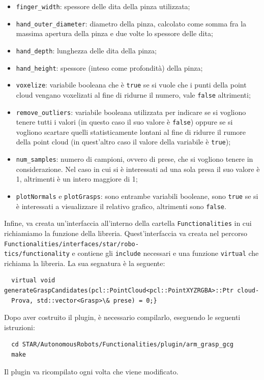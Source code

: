 \documentclass{report}
\begin{document}
\begin{itemize}
\item \texttt{finger\_width}: spessore delle dita della pinza utilizzata;
\item \texttt{hand\_outer\_diameter}: diametro della pinza, calcolato come somma fra la massima apertura della pinza e due volte lo spessore delle dita;
\item \texttt{hand\_depth}: lunghezza delle dita della pinza;
\item \texttt{hand\_height}: spessore (inteso come profondità) della pinza;
\item \texttt{voxelize}: variabile booleana che è \texttt{true} se si vuole che i punti della point cloud vengano voxelizati al fine di ridurne il numero, vale \texttt{false} altrimenti;
\item \texttt{remove\_outliers}: variabile booleana utilizzata per indicare se si vogliono tenere tutti i valori (in questo caso il suo valore è \texttt{false}) oppure se si vogliono scartare quelli statisticamente lontani al fine di ridurre il rumore della point cloud (in quest'altro caso il valore della variabile è \texttt{true});
\item \texttt{num\_samples}: numero di campioni, ovvero di prese, che si vogliono tenere in considerazione. Nel caso in cui si è interessati ad una sola presa il suo valore è 1, altrimenti è un intero maggiore di 1;
\item \texttt{plotNormals} e \texttt{plotGrasps}: sono entrambe variabili booleane, sono \texttt{true} se si è interessati a visualizzare il relativo grafico, altrimenti sono \texttt{false}.
\end{itemize}
Infine, va creata un'interfaccia all'interno della cartella \texttt{Functionalities} in cui richiamiamo la funzione della libreria. Quest'interfaccia va creata nel percorso \texttt{Functionalities/interfaces/star/robo-}\\\texttt{tics/functionality} e contiene gli \texttt{include} necessari e una funzione \texttt{virtual} che richiama la libreria. La sua segnatura è la seguente:
\begin{verbatim}
  virtual void generateGraspCandidates(pcl::PointCloud<pcl::PointXYZRGBA>::Ptr cloud-
  Prova, std::vector<Grasp>\& prese) = 0;}
\end{verbatim} 
Dopo aver costruito il plugin, è necessario compilarlo, eseguendo le seguenti istruzioni:
\begin{verbatim}
  cd STAR/AutonomousRobots/Functionalities/plugin/arm_grasp_gcg
  make
\end{verbatim} 
Il plugin va ricompilato ogni volta che viene modificato. 
\end{document}
